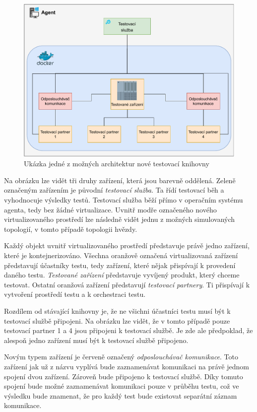 \begin{figure}[htbp]
    \centering 
    \includegraphics[width=\textwidth]{assets/img/architecture.pdf}
    \caption{Ukázka jedné z možných architektur nové testovací knihovny}
    \label{fig:architecture}
\end{figure}

Na obrázku lze vidět tři druhy zařízení, která jsou barevně oddělená. Zeleně označeným zařízením je původní \textit{testovací služba}. Ta řídí testovací běh a vyhodnocuje výsledky testů. Testovací služba běží přímo v operačním systému agenta, tedy bez žádné virtualizace. Uvnitř modře označeného nového virtualizovaného prostředí lze následně vidět jednu z možných simulovaných topologií, v tomto případě topologii hvězdy. 

Každý objekt uvnitř virtualizovaného prostředí představuje právě jedno zařízení, které je kontejnerizováno. Všechna oranžově označená virtualizovaná zařízení představují účastníky testu, tedy zařízení, které nějak přispívají k provedení daného testu. \textit{Testované zařízení} představuje vyvíjený produkt, který chceme testovat. Ostatní oranžová zařízení představují \textit{testovací partnery}. Ti přispívají k vytvoření prostředí testu a k orchestraci testu.

Rozdílem od stávající knihovny je, že ne všichni účastníci testu musí být k testovací službě připojeni. Na obrázku lze vidět, že v tomto případě pouze testovací partner 1 a 4 jsou připojeni k testovací službě. Je zde ale předpoklad, že alespoň jedno zařízení musí být k testovací službě připojeno.

Novým typem zařízení je červeně označený \textit{odposlouchávač komunikace}. Toto zařízení jak už z názvu vyplívá bude zaznamenávat komunikaci na právě jednom spojení dvou zařízení. Zároveň bude připojeno k testovací službě. Díky tomuto spojení bude možné zaznamenávat komunikaci pouze v průběhu testu, což ve výsledku bude znamenat, že pro každý test bude existovat separátní záznam komunikace.

